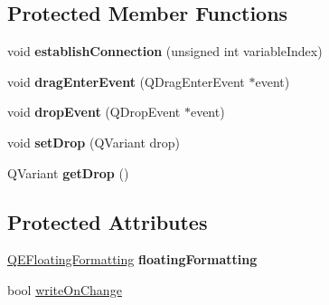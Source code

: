 \subsection*{Protected Member Functions}
\begin{DoxyCompactItemize}
\item 
\hypertarget{classQESlider_a4477ec0748238a0eca79a1edf957ee25}{
void {\bfseries establishConnection} (unsigned int variableIndex)}
\label{classQESlider_a4477ec0748238a0eca79a1edf957ee25}

\item 
\hypertarget{classQESlider_a7f8da134cd99517efc3b0b0031e1e413}{
void {\bfseries dragEnterEvent} (QDragEnterEvent $\ast$event)}
\label{classQESlider_a7f8da134cd99517efc3b0b0031e1e413}

\item 
\hypertarget{classQESlider_aefc45576bfeb65182d47fd28d69e74a4}{
void {\bfseries dropEvent} (QDropEvent $\ast$event)}
\label{classQESlider_aefc45576bfeb65182d47fd28d69e74a4}

\item 
\hypertarget{classQESlider_a2d53a2858017f4f70c20ec5956633fcb}{
void {\bfseries setDrop} (QVariant drop)}
\label{classQESlider_a2d53a2858017f4f70c20ec5956633fcb}

\item 
\hypertarget{classQESlider_ac4bbdbbd1de610b1a499aee6520032d1}{
QVariant {\bfseries getDrop} ()}
\label{classQESlider_ac4bbdbbd1de610b1a499aee6520032d1}

\end{DoxyCompactItemize}
\subsection*{Protected Attributes}
\begin{DoxyCompactItemize}
\item 
\hypertarget{classQESlider_ad6a981b382cc9dc903e767304e2a3001}{
\hyperlink{classQEFloatingFormatting}{QEFloatingFormatting} {\bfseries floatingFormatting}}
\label{classQESlider_ad6a981b382cc9dc903e767304e2a3001}

\item 
bool \hyperlink{classQESlider_a52894436044af84c826eae9bcf2be405}{writeOnChange}
\end{DoxyCompactItemize}
